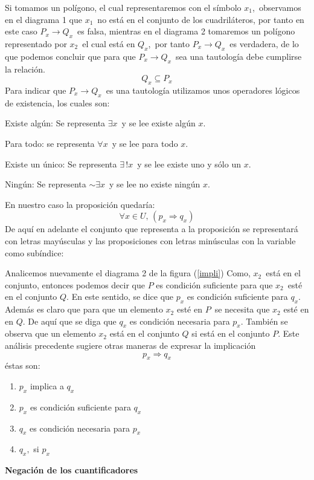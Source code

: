 Si tomamos un polígono, el cual representaremos con el símbolo $x_{1}$,\
observamos en el diagrama 1 que $x_{1}$\ no está en el conjunto
de los cuadriláteros, por tanto en este caso $P_{x}\rightarrow Q_{x}$\ es
falsa, mientras en el diagrama 2 tomaremos un polígono representado
por $x_{2}$\ el cual está en $Q_{x}$,\ por tanto $P_{x}\rightarrow Q_{x}$\ es
verdadera, de lo que podemos concluir que para que $P_{x}\rightarrow Q_{x}$\ sea
una tautología debe cumplirse la relación. 
\[
Q_{x}\subseteq P_{x}
\]
 Para indicar que $P_{x}\rightarrow Q_{x}$\ es una tautología utilizamos
unos operadores lógicos de existencia, los cuales son: \begin{lista} 

\item Existe algún: Se representa $\exists x$\ y se lee existe
algún $x.$ 

\item Para todo: se representa $\forall x$\ y se lee para todo
$x.$ 

\item Existe un único: Se representa $\exists\,!x$\ y se lee existe
uno y sólo un $x.$ 

\item Ningún: Se representa $\sim\exists x$\ y se lee no existe
ningún $x.$ \end{lista} En nuestro caso la proposición quedaría:
\[
\forall x\in U,\,(p_{x}\Rightarrow q_{x})
\]
 De aquí en adelante el conjunto que representa a la proposición se
representará con letras mayúsculas y las proposiciones con letras
minúsculas con la variable como subíndice: 

Analicemos nuevamente el diagrama 2 de la figura (\ref{impli}) Como,
$x_{2}$\ está en el conjunto, entonces podemos decir que $P$ es
condición suficiente para que $x_{2}$\ esté en el conjunto $Q$.
En este sentido, se dice que $p_{x}$ es condición suficiente para
$q_{x}$. Además es claro que para que un elemento $x_{2}$ esté en
$P$\ se necesita que $x_{2}$ esté en en $Q$. De aquí que se diga
que $q_{x}$ es condición necesaria para $p_{x}.$ También se observa
que un elemento $x_{2}$ está en el conjunto $Q$ si está en el conjunto
$P$. Este análisis precedente sugiere otras maneras de expresar la
implicación 
\[
p_{x}\Rightarrow q_{x}
\]
 éstas son:
\begin{enumerate}
\item $p_{x}$ implica a $q_{x}$
\item $p_{x}$ es condición suficiente para $q_{x}$
\item $q_{x}$ es condición necesaria para $p_{x}$
\item $q_{x},$ si $p_{x}$ 
\end{enumerate}
\textbf{Negación de los cuantificadores}

